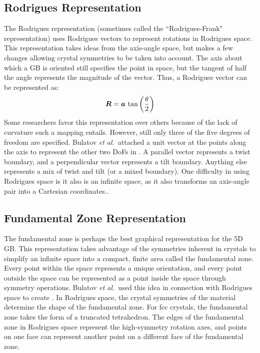 \documentclass[twoside,senior]{BYUPhys}
\begin{document}
\subsection{Rodrigues Representation\label{GBReps:Rodrigues}}
The Rodrigues representation (sometimes called the ``Rodrigues-Frank" representation) uses Rodrigues vectors to represent rotations in Rodrigues space.  This representation takes ideas from the axis-angle space, but makes a few changes allowing crystal symmetries to be taken into account.  The axis about which a GB is oriented still specifies the point in space, but the tangent of half the angle represents the magnitude of the vector. Thus, a Rodrigues vector can be represented as:\cite{morawiec1996, becker1989, frank1988, randle2000, priester2013}
\begin{equation}
\bm{R}=\bm{a}\ \textnormal{tan}\left(\frac{\theta}{2}\right)
\label{eq:rodriguesVec}
\end{equation}
Some researchers favor this representation over others because of the lack of curvature such a mapping entails.\cite{frank1988, randle2000}  However, still only three of the five degrees of freedom are specified.  Bulatov \emph{et al.}\ attached a unit vector at the points along the axis to represent the other two DoFs in . A parallel vector represents a twist boundary, and a perpendicular vector represents a tilt boundary.  Anything else represents a mix of twist and tilt (or a mixed boundary).  One difficulty in using Rodrigues space is it also is an infinite space, as it also transforms an axis-angle pair into a Cartesian coordinates.\cite{frank1988, kirch2008}.

\subsection{Fundamental Zone Representation\label{GBReps:FunZone}}
The fundamental zone is perhaps the best graphical representation for the 5D GB.  This representation takes advantage of the symmetries inherent in crystals\cite{stokes2007} to simplify an infinite space into a compact, finite area called the fundamental zone.\cite{bulatov2014, patala2013, homer2015, morawiec1996, patala2012}  Every point within the space represents a unique orientation, and every point outside the space can be represented as a point inside the space through symmetry operations.\cite{morawiec1996, becker1989, frank1988}  Bulatov \emph{et al.}\ used this idea in connection with Rodrigues space to create .  In Rodrigues space, the crystal symmetries of the material determine the shape of the fundamental zone.\cite{patala2013, morawiec1996}  For fcc crystals, the fundamental zone takes the form of a truncated tetrahedron.\cite{bulatov2014}  The edges of the fundamental zone in Rodrigues space represent the high-symmetry rotation axes, and points on one face can represent another point on a different face of the fundamental zone.  
\end{document}
